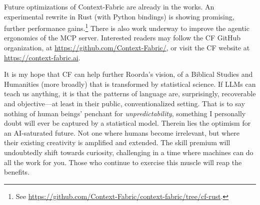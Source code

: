\documentclass[11pt,a4paper]{article}
\begin{document}
Future optimizations of Context-Fabric are already in the works. An experimental rewrite in Rust
(with Python bindings) is showing promising, further performance gains.\footnote{
    See \url{https://github.com/Context-Fabric/context-fabric/tree/cf-rust}.
}
There is also work underway to improve the agentic ergonomics of the MCP server. Interested
readers may follow the CF GitHub organization, at \url{https://github.com/Context-Fabric/},
or visit the CF website at \url{https://context-fabric.ai}.

It is my hope that CF can help further Roorda's vision, of a Biblical Studies and Humanities
(more broadly) that is transformed by statistical science. If LLMs can teach us anything,
it is that the patterns of language are, surprisingly, recoverable and objective---at least in their public, conventionalized
setting. That is to say nothing of human beings' penchant for \textit{unpredictability}, something
I personally doubt will ever be captured by a statistical model. Therein lies the optimism for
an AI-saturated future. Not one where humans become irrelevant, but where their existing
creativity is amplified and extended. The skill premium will undoubtedly shift towards curiosity,
challenging in a time where machines can do all the work for you. Those who continue to exercise
this muscle will reap the benefits.
\end{document}
